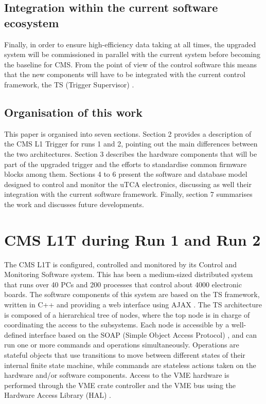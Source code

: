 \documentclass[a4paper]{jpconf}
\begin{document}
\subsection{Integration within the current software ecosystem}
Finally, in order to ensure high-efficiency data taking at all times, the upgraded system will be commissioned in parallel with the current system before becoming the baseline for CMS. From the point of view of the control software this means that the new components will have to be integrated with the current control framework, the TS (Trigger Supervisor) \cite{ts_concept}.

\subsection{Organisation of this work}
This paper is organised into seven sections. Section 2 provides a description of the CMS L1 Trigger for runs 1 and 2, pointing out the main differences between the two architectures. Section 3 describes the hardware components that will be part of the upgraded trigger and the efforts to standardise common firmware blocks among them. Sections 4 to 6 present the software and database model designed to control and monitor the uTCA electronics, discussing as well their integration with the current software framework. Finally, section 7 summarises the work and discusses future developments.

\section{CMS L1T during Run 1 and Run 2}


The CMS L1T is configured, controlled and monitored by its Control and Monitoring Software system. This has been a medium-sized distributed system that runs over 40 PCs and 200 processes that control about 4000 electronic boards. The software components of this system are based on the TS framework, written in C++ and providing a web interface using AJAX \cite{ajaxell_lib}. The TS architecture is composed of a hierarchical tree of nodes, where the top node is in charge of coordinating the access to the subsystems. Each node is accessible by a well-defined interface based on the SOAP (Simple Object Access Protocol) \cite{soap_spec}, and can run one or more commands and operations simultaneously. Operations are stateful objects that use transitions to move between different states of their internal finite state machine, while commands are stateless actions taken on the hardware and/or software components. Access to the VME hardware is performed through the VME crate controller and the VME bus using the Hardware Access Library (HAL) \cite{hal_doc}. 
\end{document}
